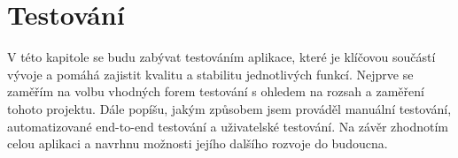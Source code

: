 \chapter{Testování}

V této kapitole se budu zabývat testováním aplikace, které je klíčovou součástí vývoje a pomáhá zajistit kvalitu a stabilitu jednotlivých funkcí. Nejprve se zaměřím na volbu vhodných forem testování s ohledem na rozsah a zaměření tohoto projektu. Dále popíšu, jakým způsobem jsem prováděl manuální testování, automatizované end-to-end testování a uživatelské testování. Na závěr zhodnotím celou aplikaci a navrhnu možnosti jejího dalšího rozvoje do budoucna.
